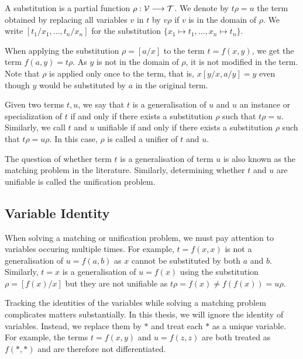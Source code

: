 \begin{defn}
  A substitution is a partial function $\rho : \mathcal{V} \longrightarrow \mathcal{T}$. We denote by $t \rho = u$ the term obtained by replacing all variables $v$ in $t$ by $v \rho$ if $v$ is in the domain of $\rho$. We write $[t_{1}/x_{1},...,t_{n}/x_{n}]$ for the substitution $\{x_{1} \mapsto t_{1}, ..., x_{n} \mapsto t_{n}\}$.
\end{defn}

When applying the substitution $\rho = [a/x]$ to the term $t = f(x,y)$, we get the term $f(a,y) = t \rho$. As $y$ is not in the domain of $\rho$, it is not modified in the term. Note that $\rho$ is applied only once to the term, that is, $x [y/x, a/y] = y$ even though $y$ would be substituted by $a$ in the original term.

\begin{defn}
Given two terms $t, u$, we say that $t$ is a generalisation of $u$ and $u$ an instance or specialization of $t$ if and only if there exists a substitution $\rho$ such that $t \rho = u$. Similarly, we call $t$ and $u$ unifiable if and only if there exists a substitution $\rho$ such that $t \rho = u \rho$. In this case, $\rho$ is called a unifier of $t$ and $u$.
\end{defn}

The question of whether term $t$ is a generalisation of term $u$ is also known as the matching problem in the literature. Similarly, determining whether $t$ and $u$ are unifiable is called the unification problem. \cite{mccune_experiments_1992}

\subsection{Variable Identity}\label{var_id}
When solving a matching or unification problem, we must pay attention to variables occuring multiple times. For example, $t = f(x,x)$ is not a generalisation of $u = f(a,b)$ as $x$ cannot be substituted by both $a$ and $b$. Similarly, $t = x$ is a generalisation of $u = f(x)$ using the substitution $\rho = [f(x)/x]$ but they are not unifiable as $t \rho = f(x) \neq f(f(x)) = u \rho$.

Tracking the identities of the variables while solving a matching problem complicates matters substantially. In this thesis, we will ignore the identity of variables. Instead, we replace them by $*$ and treat each $*$ as a unique variable. For example, the terms $t = f(x,y)$ and $u = f(z,z)$ are both treated as $f(*,*)$ and are therefore not differentiated.

